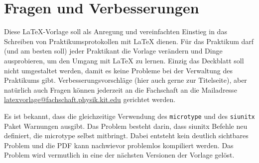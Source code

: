 \section{Fragen und Verbesserungen}
Diese LaTeX-Vorlage soll als Anregung und vereinfachten Einstieg in das Schreiben von Praktikumsprotokollen mit LaTeX dienen. Für das Praktikum darf (und am besten soll) jeder Praktikant die Vorlage verändern und Dinge ausprobieren, um den Umgang mit LaTeX zu lernen. Einzig das Deckblatt soll nicht umgestaltet werden, damit es keine Probleme bei der Verwaltung des Praktikums gibt. Verbesserungsvorschläge (hier auch gerne zur Titelseite), aber natürlich auch Fragen können jederzeit an die Fachschaft an die Mailadresse \href{mailto:latexvorlage@fachschaft.physik.kit.edu}{latexvorlage@fachschaft.physik.kit.edu} gerichtet werden.

Es ist bekannt, dass die gleichzeitige Verwendung des \verb|microtype| und des \verb|siunitx| Paket Warnungen ausgibt. Das Problem besteht darin, dass siunitx Befehle neu definiert, die microtype selbst mitbringt. Dabei entsteht kein deutlich sichtbares Problem und die PDF kann nachwievor problemlos kompiliert werden. Das Problem wird vermutlich in eine der nächsten Versionen der Vorlage gelöst.
